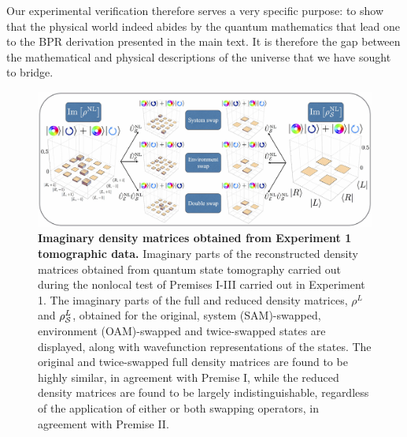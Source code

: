 \documentclass[12pt]{iopart}
\begin{document}
Our experimental verification therefore serves a very specific purpose: to show that the physical world indeed abides by the quantum mathematics that lead one to the BPR derivation presented in the main text. It is therefore the gap between the mathematical and physical descriptions of the universe that we have sought to bridge.
%
\begin{figure}[t]
	\centering
	\includegraphics[width=\columnwidth]{fig5.jpg}
	\caption{{\bf Imaginary density matrices obtained from Experiment 1 tomographic data.} Imaginary parts of the reconstructed density matrices obtained from quantum state tomography carried out during the nonlocal test of Premises I-III carried out in Experiment 1. The imaginary parts of the full and reduced density matrices, $\rho^{L}$ and $\rho^{L}_{\cal S}$, obtained for the original, system (SAM)-swapped, environment (OAM)-swapped and twice-swapped states are displayed, along with wavefunction representations of the states. The original and twice-swapped full density matrices are found to be highly similar, in agreement with Premise I, while the reduced density matrices are found to be largely indistinguishable, regardless of the application of either or both swapping operators, in agreement with Premise II.}%
	\label{fig:fig5}
\end{figure}
%

\end{document}
